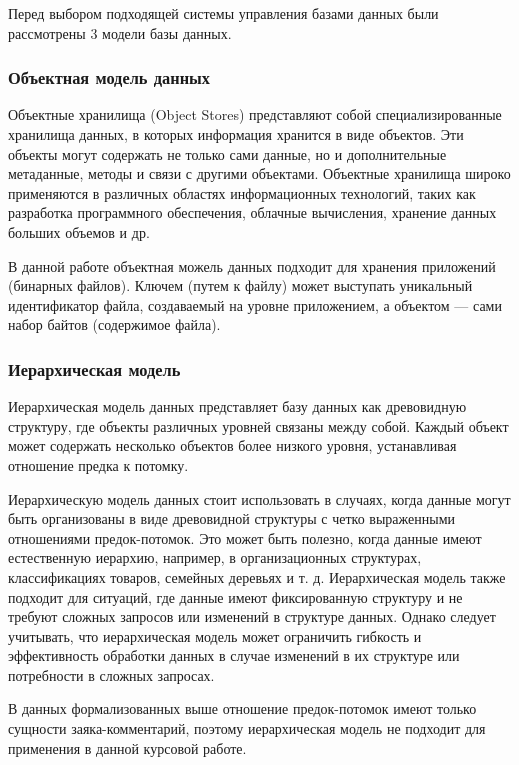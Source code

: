 Перед выбором подходящей системы управления базами данных были рассмотрены 3 модели базы данных.

\subsubsection{Объектная модель данных}

Объектные хранилища (Object Stores) представляют собой специализированные хранилища данных, в которых информация хранится в виде объектов. Эти объекты могут содержать не только сами данные, но и дополнительные метаданные, методы и связи с другими объектами. Объектные хранилища широко применяются в различных областях информационных технологий, таких как разработка программного обеспечения, облачные вычисления, хранение данных больших объемов и др.


В данной работе объектная можель данных подходит для хранения приложений (бинарных файлов).  Ключем (путем к файлу) может выступать уникальный идентификатор файла, создаваемый на уровне приложением, а объектом --- сами набор байтов (содержимое файла).

\subsubsection{Иерархическая модель}

Иерархическая модель данных представляет базу данных как древовидную структуру, где объекты различных уровней связаны между собой. Каждый объект может содержать несколько объектов более низкого уровня, устанавливая отношение предка к потомку.

Иерархическую модель данных стоит использовать в случаях, когда данные могут быть организованы в виде древовидной структуры с четко выраженными отношениями предок-потомок. Это может быть полезно, когда данные имеют естественную иерархию, например, в организационных структурах, классификациях товаров, семейных деревьях и т. д. Иерархическая модель также подходит для ситуаций, где данные имеют фиксированную структуру и не требуют сложных запросов или изменений в структуре данных. Однако следует учитывать, что иерархическая модель может ограничить гибкость и эффективность обработки данных в случае изменений в их структуре или потребности в сложных запросах. 

В данных формализованных выше отношение предок-потомок имеют только сущности заяка-комментарий, поэтому иерархическая модель не подходит для применения в данной курсовой работе.

